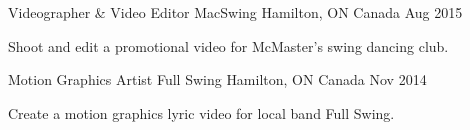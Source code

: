 


\begin{cventries}


\cventry
{Videographer \& Video Editor} %
{MacSwing} %
{Hamilton, ON Canada} %
{Aug 2015} %
{ %
\begin{cvitems}
\item {Shoot and edit a promotional video for McMaster's swing dancing club.} 
\end{cvitems}
}


\cventry
{Motion Graphics Artist} %
{Full Swing} %
{Hamilton, ON Canada} %
{Nov 2014} %
{ %
\begin{cvitems}
\item {Create a motion graphics lyric video for local band Full Swing.}
\end{cvitems}
}


\end{cventries}